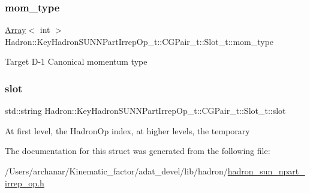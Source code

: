 \subsubsection{\texorpdfstring{mom\_type}{mom\_type}}
{\footnotesize\ttfamily \mbox{\hyperlink{classXMLArray_1_1Array}{Array}}$<$ int $>$ Hadron\+::\+Key\+Hadron\+S\+U\+N\+N\+Part\+Irrep\+Op\+\_\+t\+::\+C\+G\+Pair\+\_\+t\+::\+Slot\+\_\+t\+::mom\+\_\+type}

Target D-\/1 Canonical momentum type \mbox{\label{structHadron_1_1KeyHadronSUNNPartIrrepOp__t_1_1CGPair__t_1_1Slot__t_aac0f3ecb03784adb64cac8f9960608bd}} 
\subsubsection{\texorpdfstring{slot}{slot}}
{\footnotesize\ttfamily std\+::string Hadron\+::\+Key\+Hadron\+S\+U\+N\+N\+Part\+Irrep\+Op\+\_\+t\+::\+C\+G\+Pair\+\_\+t\+::\+Slot\+\_\+t\+::slot}

At first level, the Hadron\+Op index, at higher levels, the temporary 

The documentation for this struct was generated from the following file\+:\begin{DoxyCompactItemize}
\item 
/\+Users/archanar/\+Kinematic\+\_\+factor/adat\+\_\+devel/lib/hadron/\mbox{\hyperlink{lib_2hadron_2hadron__sun__npart__irrep__op_8h}{hadron\+\_\+sun\+\_\+npart\+\_\+irrep\+\_\+op.\+h}}\end{DoxyCompactItemize}
